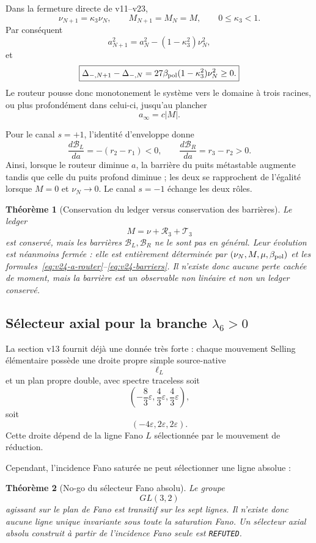 \documentclass[11pt,a4paper]{article}
\newtheorem{theorem}{Théorème}[section]
\newcommand{\certRefuted}{\texttt{REFUTED}}
\begin{document}
Dans la fermeture directe de v11--v23,
\[
 \nu_{N+1}=\kappa_3\nu_N,
 \qquad
 M_{N+1}=M_N=M,
 \qquad
 0\le\kappa_3<1.
\]
Par conséquent
\begin{equation}\label{eq:v24-a-router}
 \boxed{
 a_{N+1}^2
 =
 a_N^2-(1-\kappa_3^2)\nu_N^2,}
\end{equation}
et
\begin{equation}\label{eq:v24-Delta-router}
 \boxed{
 \Delta_{-,N+1}-\Delta_{-,N}
 =
 27\beta_{\rm pol}(1-\kappa_3^2)\nu_N^2
 \ge0.}
\end{equation}
Le routeur pousse donc monotonement le système vers le domaine à trois racines, ou plus profondément dans celui-ci, jusqu'au plancher
\[
 a_\infty=c|M|.
\]

Pour le canal $s=+1$, l'identité d'enveloppe donne
\[
 \frac{d\mathcal B_L}{da}
 =-(r_2-r_1)<0,
 \qquad
 \frac{d\mathcal B_R}{da}
 =r_3-r_2>0.
\]
Ainsi, lorsque le routeur diminue $a$, la barrière du puits métastable augmente tandis que celle du puits profond diminue ; les deux se rapprochent de l'égalité lorsque $M=0$ et $\nu_N\to0$. Le canal $s=-1$ échange les deux rôles.

\begin{theorem}[Conservation du ledger versus conservation des barrières]\label{thm:v24-barrier-transport}
Le ledger
\[
 M=\nu+\mathscr R_3+\mathscr T_3
\]
est conservé, mais les barrières $\mathcal B_L,\mathcal B_R$ ne le sont pas en général. Leur évolution est néanmoins fermée : elle est entièrement déterminée par $(\nu_N,M,\mu,\beta_{\rm pol})$ et les formules~\eqref{eq:v24-a-router}--\eqref{eq:v24-barriers}. Il n'existe donc aucune perte cachée de moment, mais la barrière est un observable non linéaire et non un ledger conservé.
\end{theorem}

\subsection{Sélecteur axial pour la branche \texorpdfstring{$\lambda_6>0$}{lambda6>0}}

La section v13 fournit déjà une donnée très forte : chaque mouvement Selling élémentaire possède une droite propre simple source-native
\[
 \ell_L
\]
et un plan propre double, avec spectre traceless soit
\[
 \left(-\frac83\varepsilon,\frac43\varepsilon,\frac43\varepsilon\right),
\]
soit
\[
 (-4\varepsilon,2\varepsilon,2\varepsilon).
\]
Cette droite dépend de la ligne Fano $L$ sélectionnée par le mouvement de réduction.

Cependant, l'incidence Fano saturée ne peut sélectionner une ligne absolue :
\begin{theorem}[No-go du sélecteur Fano absolu]\label{thm:v24-Fano-selector-nogo}
Le groupe
\[
 GL(3,2)
\]
agissant sur le plan de Fano est transitif sur les sept lignes. Il n'existe donc aucune ligne unique invariante sous toute la saturation Fano. Un sélecteur axial absolu construit à partir de l'incidence Fano seule est \certRefuted{}.
\end{theorem}
\end{document}

